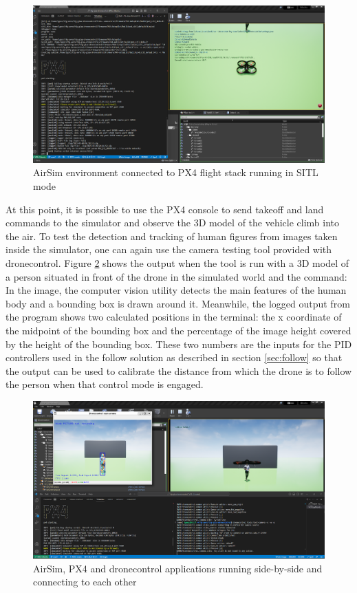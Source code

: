 \begin{figure}
  \centering
  \includegraphics[width=\textwidth, keepaspectratio]{img/airsim-sitl.png}
  \caption{AirSim environment connected to PX4 flight stack running in SITL mode}
  \label{fig:airsim-sitl}
\end{figure}

At this point, it is possible to use the PX4 console to send takeoff and land commands to the simulator and observe the 3D model of the vehicle climb into the air.
To test the detection and tracking of human figures from images taken inside the simulator, one can again use the camera testing tool provided with dronecontrol.
Figure \ref{fig:airsim-sitl-pose} shows the output when the tool is run with a 3D model of a person situated in front of the drone in the simulated world and the command:
In the image, the computer vision utility detects the main features of the human body and a bounding box is drawn around it.
Meanwhile, the logged output from the program shows two calculated positions in the terminal: the x coordinate of the midpoint of the bounding box and the percentage of the image height covered by the height of the bounding box.
These two numbers are the inputs for the PID controllers used in the follow solution as described in section \ref{sec:follow} so that the output can be used to calibrate the distance from which the drone is to follow the person when that control mode is engaged.

\begin{figure}
  \centering
  \includegraphics[width=\textwidth, keepaspectratio]{img/airsim-sitl-pose.png}
  \caption{AirSim, PX4 and dronecontrol applications running side-by-side and connecting to each other}
  \label{fig:airsim-sitl-pose}
\end{figure}

